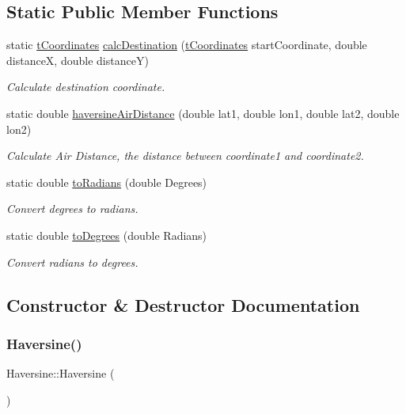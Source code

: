 \subsection*{Static Public Member Functions}
\begin{DoxyCompactItemize}
\item 
static \hyperlink{_psd_message_decoder_8h_a559ada7297c8c6c2337f9e233e73aeca}{t\+Coordinates} \hyperlink{class_haversine_a987c479bce2991c1eb55953a787ff144}{calc\+Destination} (\hyperlink{_psd_message_decoder_8h_a559ada7297c8c6c2337f9e233e73aeca}{t\+Coordinates} start\+Coordinate, double distanceX, double distanceY)
\begin{DoxyCompactList}\small\item\em Calculate destination coordinate. \end{DoxyCompactList}\item 
static double \hyperlink{class_haversine_a6c122c479cb1a1d56fc5df31ecc5d144}{haversine\+Air\+Distance} (double lat1, double lon1, double lat2, double lon2)
\begin{DoxyCompactList}\small\item\em Calculate Air Distance, the distance between coordinate1 and coordinate2. \end{DoxyCompactList}\item 
static double \hyperlink{class_haversine_af0832536dda3b76d4e43798de71dc9a6}{to\+Radians} (double Degrees)
\begin{DoxyCompactList}\small\item\em Convert degrees to radians. \end{DoxyCompactList}\item 
static double \hyperlink{class_haversine_a60649a2f8a63a8413dba515c9ae6f6e2}{to\+Degrees} (double Radians)
\begin{DoxyCompactList}\small\item\em Convert radians to degrees. \end{DoxyCompactList}\end{DoxyCompactItemize}


\subsection{Constructor \& Destructor Documentation}
\mbox{\label{class_haversine_a844317944919ea6745317cd8f74b18c6}} 
\subsubsection{\texorpdfstring{Haversine()}{Haversine()}}
{\footnotesize\ttfamily Haversine\+::\+Haversine (\begin{DoxyParamCaption}{ }\end{DoxyParamCaption})}



